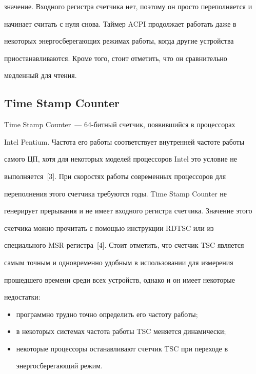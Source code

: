 значение. Входного регистра счетчика нет, поэтому он просто переполняется и 


начинает считать с нуля снова. Таймер ACPI продолжает работать даже в 


некоторых энергосберегающих режимах работы, когда другие устройства 


приостанавливаются. Кроме того, стоит отметить, что он сравнительно 


медленный для чтения.


\subsection{Time Stamp Counter}





     Time Stamp Counter~--- 64-битный счетчик, появившийся в процессорах 


Intel Pentium. Частота его работы соответствует внутренней частоте работы 


самого ЦП, хотя для некоторых моделей процессоров Intel это условие не 


выполняется~[3]. При скоростях работы современных процессоров для 


переполнения этого счетчика требуются годы. Time Stamp Counter не 


генерирует прерывания и не имеет входного регистра счетчика. Значение этого 


счетчика можно прочитать с помощью инструкции RDTSC или из 


специального MSR-ре\-гист\-ра~[4]. Стоит отметить, что счетчик TSC является 


самым точным и одновременно удобным в использовании для измерения 


прошедшего времени среди всех устройств, однако и он имеет некоторые 


недостатки:


     \begin{itemize}


\item программно трудно точно определить его частоту работы;


\item в некоторых системах частота работы TSC меняется динамически;


\item некоторые процессоры останавливают счетчик TSC при переходе в 


энер\-го\-сбе\-ре\-га\-ющий режим.


\end{itemize}





